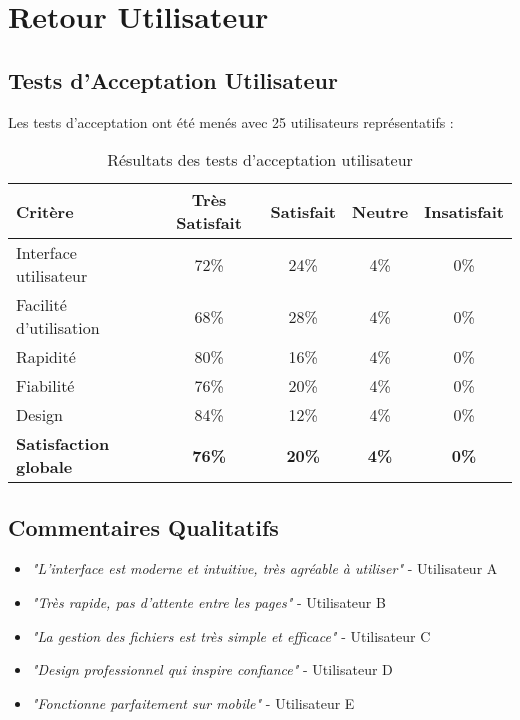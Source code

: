 \section{Retour Utilisateur}

\subsection{Tests d'Acceptation Utilisateur}

Les tests d'acceptation ont été menés avec 25 utilisateurs représentatifs :

\begin{table}[H]
    \centering
    \begin{tabularx}{\textwidth}{|l|c|c|c|c|}
        \hline
        \textbf{Critère} & \textbf{Très Satisfait} & \textbf{Satisfait} & \textbf{Neutre} & \textbf{Insatisfait} \\
        \hline
        Interface utilisateur & 72\% & 24\% & 4\% & 0\% \\
        \hline
        Facilité d'utilisation & 68\% & 28\% & 4\% & 0\% \\
        \hline
        Rapidité & 80\% & 16\% & 4\% & 0\% \\
        \hline
        Fiabilité & 76\% & 20\% & 4\% & 0\% \\
        \hline
        Design & 84\% & 12\% & 4\% & 0\% \\
        \hline
        \textbf{Satisfaction globale} & \textbf{76\%} & \textbf{20\%} & \textbf{4\%} & \textbf{0\%} \\
        \hline
    \end{tabularx}
    \caption{Résultats des tests d'acceptation utilisateur}
    \label{tab:user_acceptance}
\end{table}

\subsection{Commentaires Qualitatifs}

\begin{itemize}
    \item \textit{"L'interface est moderne et intuitive, très agréable à utiliser"} - Utilisateur A
    \item \textit{"Très rapide, pas d'attente entre les pages"} - Utilisateur B
    \item \textit{"La gestion des fichiers est très simple et efficace"} - Utilisateur C
    \item \textit{"Design professionnel qui inspire confiance"} - Utilisateur D
    \item \textit{"Fonctionne parfaitement sur mobile"} - Utilisateur E
\end{itemize}

